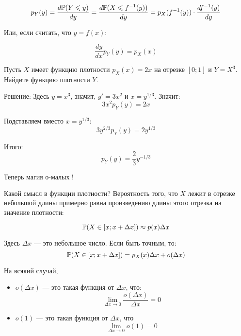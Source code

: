 \[ p_{Y}(y)=\frac{d\P(Y\leq y)}{dy}=\frac{d\P(X\leq f^{-1}(y))}{dy}=p_{X}(f^{-1}(y))\cdot \frac{df^{-1}(y)}{dy} \]

Или, если считать, что $ y=f(x) $:

\begin{equation}
\frac{dy}{dx}p_{Y}(y)=p_{X}(x)
\end{equation}

\begin{myex} Пусть $ X $ имеет функцию плотности $ p_{X}(x)=2x $ на отрезке $ [0;1] $ и $ Y=X^{3} $. Найдите функцию плотности $ Y $.

Решение: Здесь $ y=x^{3} $, значит, $ y'=3x^{2} $ и $ x=y^{1/3} $. Значит:
\begin{equation}
3x^{2}p_{Y}(y)=2x
\end{equation}

Подставляем вместо $ x=y^{1/3} $:
\begin{equation}
3y^{2/3}p_{Y}(y)=2y^{1/3}
\end{equation}

Итого:
\begin{equation}
p_{Y}(y)=\frac{2}{3}y^{-1/3}
\end{equation}
\end{myex}

Теперь магия о-малых !

Какой смысл в функции плотности? Вероятность того, что $ X $ лежит в отрезке небольшой длины примерно равна произведению длины этого отрезка на значение плотности:

\begin{equation}
\P(X\in [x;x+\Delta x])\approx p(x)\Delta x
\end{equation}

Здесь $ \Delta x $ — это небольшое число. Если быть точным, то:
\begin{equation}
\P(X\in [x;x+\Delta x])=p_{X}(x)\Delta x+o(\Delta x)
\end{equation}


На всякий случай,
\begin{itemize}
\item $ o(\Delta x) $ — это такая функция от $ \Delta x $, что:
\begin{equation}
\lim_{\Delta x\to 0} \frac{o(\Delta x)}{\Delta x}=0
\end{equation}
\item $ o(1) $ — это такая функция от $ \Delta x $, что
\begin{equation}
\lim_{\Delta x \to 0} o(1)=0
\end{equation}


\end{itemize}



